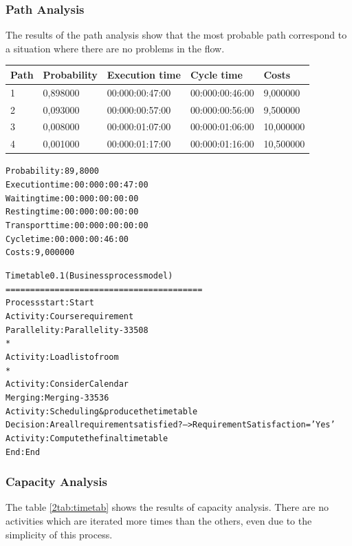 \subsubsection{Path Analysis}
The results of the path analysis show that the most probable path
correspond to a situation where there are no problems in the flow.

\begin{table}[ht!]
\centering
\begin{tabular}{|l|l|l|l|l|}
\hline
Path&Probability&Execution time&Cycle time&Costs\\
\hline
1&0,898000&00:000:00:47:00&00:000:00:46:00&9,000000\\
\hline
2&0,093000&00:000:00:57:00&00:000:00:56:00&9,500000\\
\hline
3&0,008000&00:000:01:07:00&00:000:01:06:00&10,000000\\
\hline
4&0,001000&00:000:01:17:00&00:000:01:16:00&10,500000\\
\hline
\end{tabular}
\end{table}

\begin{alltt}
Probability:   89,8000%
Execution time:  00:000:00:47:00
Waiting time:  00:000:00:00:00
Resting time:  00:000:00:00:00
Transport time:  00:000:00:00:00
Cycle time:  00:000:00:46:00
Costs:  9,000000

Timetable 0.1 (Business process model)
========================================
Process start: Start
Activity: Course requirement
Parallelity: Parallelity-33508
    *
    Activity: Load list of room
    *
    Activity: Consider Calendar
Merging: Merging-33536
Activity: Scheduling & produce the timetable
Decision: Are all requirement satisfied? --> RequirementSatisfaction='Yes'
Activity: Compute the final timetable
End: End
\end{alltt}

\subsubsection{Capacity Analysis}
The table \ref{2tab:timetab} shows the results of capacity analysis.
There are no activities which are iterated more times than the others,
even due to the simplicity of this process.


